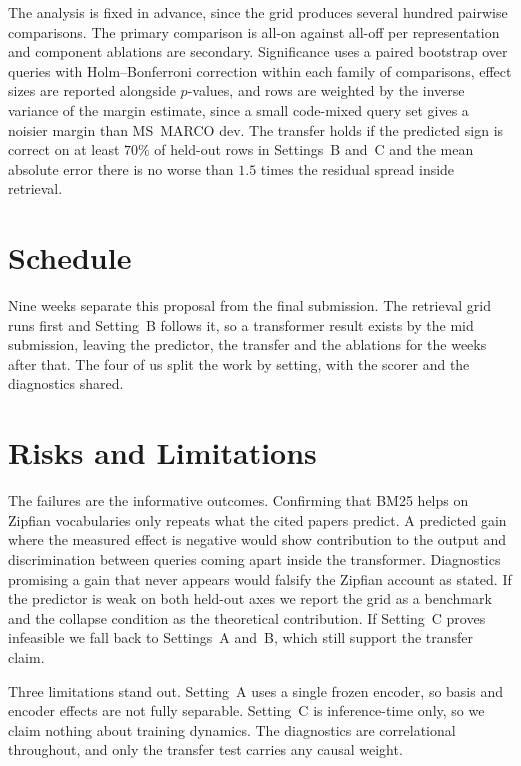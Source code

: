 \documentclass[11pt]{article}
\begin{document}
The analysis is fixed in advance, since the grid produces several hundred pairwise
comparisons. The primary comparison is all-on against all-off per representation
and component ablations are secondary. Significance uses a paired bootstrap over
queries with Holm--Bonferroni correction within each family of comparisons, effect
sizes are reported alongside $p$-values, and rows are weighted by the inverse
variance of the margin estimate, since a small code-mixed query set gives a noisier
margin than MS~MARCO dev. The transfer holds if the predicted sign is correct on at
least $70\%$ of held-out rows in Settings~B and~C and the mean absolute error there
is no worse than $1.5$ times the residual spread inside retrieval.

\section{Schedule}
\label{sec:schedule}

Nine weeks separate this proposal from the final submission. The retrieval grid runs
first and Setting~B follows it, so a transformer result exists by the mid submission,
leaving the predictor, the transfer and the ablations for the weeks after that. The
four of us split the work by setting, with the scorer and the diagnostics shared.

\section{Risks and Limitations}
\label{sec:risks}

The failures are the informative outcomes. Confirming that BM25 helps on
Zipfian vocabularies only repeats what the cited papers predict. A predicted gain where the
measured effect is negative would show contribution to the output and discrimination
between queries coming apart inside the transformer. Diagnostics promising a gain that never appears would falsify the
Zipfian account as stated. If the predictor is weak on both held-out axes we report
the grid as a benchmark and the collapse condition as the theoretical contribution. If
Setting~C proves infeasible we fall back to Settings~A and~B, which still support the
transfer claim.

Three limitations stand out. Setting~A uses a single frozen encoder, so basis and
encoder effects are not fully separable. Setting~C is inference-time only, so we claim
nothing about training dynamics. The diagnostics are correlational throughout, and
only the transfer test carries any causal weight.


\end{document}

